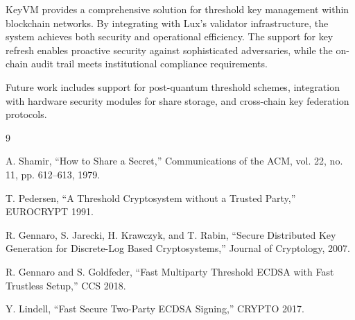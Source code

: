 \documentclass[11pt,twocolumn]{article}
\begin{document}
KeyVM provides a comprehensive solution for threshold key management within blockchain networks. By integrating with Lux's validator infrastructure, the system achieves both security and operational efficiency. The support for key refresh enables proactive security against sophisticated adversaries, while the on-chain audit trail meets institutional compliance requirements.

Future work includes support for post-quantum threshold schemes, integration with hardware security modules for share storage, and cross-chain key federation protocols.


\begin{thebibliography}{9}

A. Shamir, ``How to Share a Secret,'' Communications of the ACM, vol. 22, no. 11, pp. 612--613, 1979.

T. Pedersen, ``A Threshold Cryptosystem without a Trusted Party,'' EUROCRYPT 1991.

R. Gennaro, S. Jarecki, H. Krawczyk, and T. Rabin, ``Secure Distributed Key Generation for Discrete-Log Based Cryptosystems,'' Journal of Cryptology, 2007.

R. Gennaro and S. Goldfeder, ``Fast Multiparty Threshold ECDSA with Fast Trustless Setup,'' CCS 2018.

Y. Lindell, ``Fast Secure Two-Party ECDSA Signing,'' CRYPTO 2017.

\end{thebibliography}
\end{document}
